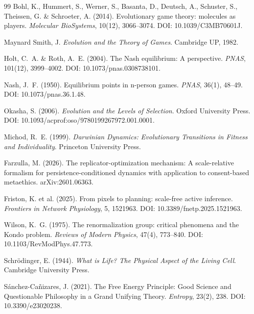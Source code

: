 \documentclass[12pt,a4paper]{article}
\theoremstyle{remark}
\begin{document}
\begin{thebibliography}{99}
Bohl, K., Hummert, S., Werner, S., Basanta, D., Deutsch, A., Schuster, S., Theissen, G. \& Schroeter, A. (2014).
\newblock Evolutionary game theory: molecules as players.
\newblock \textit{Molecular BioSystems}, 10(12), 3066--3074.
\newblock DOI: 10.1039/C3MB70601J.

Maynard Smith, J.
\newblock \textit{Evolution and the Theory of Games}.
\newblock Cambridge UP, 1982.

Holt, C.~A. \& Roth, A.~E. (2004).
\newblock The Nash equilibrium: A perspective.
\newblock \textit{PNAS}, 101(12), 3999--4002.
\newblock DOI: 10.1073/pnas.0308738101.

Nash, J.~F. (1950).
\newblock Equilibrium points in n-person games.
\newblock \textit{PNAS}, 36(1), 48--49.
\newblock DOI: 10.1073/pnas.36.1.48.


Okasha, S. (2006).
\newblock \textit{Evolution and the Levels of Selection}.
\newblock Oxford University Press.
\newblock DOI: 10.1093/acprof:oso/9780199267972.001.0001.

Michod, R.~E. (1999).
\newblock \textit{Darwinian Dynamics: Evolutionary Transitions in Fitness and Individuality}.
\newblock Princeton University Press.

Farzulla, M. (2026).
\newblock The replicator-optimization mechanism: A scale-relative formalism for persistence-conditioned dynamics with application to consent-based metaethics.
\newblock arXiv:2601.06363.

Friston, K. et al. (2025).
\newblock From pixels to planning: scale-free active inference.
\newblock \textit{Frontiers in Network Physiology}, 5, 1521963.
\newblock DOI: 10.3389/fnetp.2025.1521963.

Wilson, K.~G. (1975).
\newblock The renormalization group: critical phenomena and the Kondo problem.
\newblock \textit{Reviews of Modern Physics}, 47(4), 773--840.
\newblock DOI: 10.1103/RevModPhys.47.773.

Schrödinger, E. (1944).
\newblock \textit{What is Life? The Physical Aspect of the Living Cell}.
\newblock Cambridge University Press.

S\'anchez-Ca\~nizares, J. (2021).
\newblock The Free Energy Principle: Good Science and Questionable Philosophy in a Grand Unifying Theory.
\newblock \textit{Entropy}, 23(2), 238.
\newblock DOI: 10.3390/e23020238.


\end{thebibliography}
\end{document}

